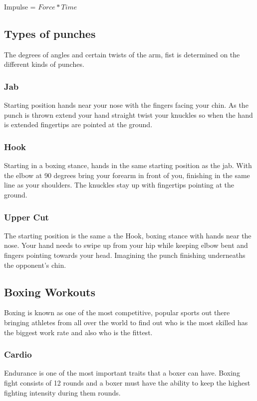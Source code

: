 \documentclass[a4paper,12pt]{report}
\begin{document}
Impulse = $Force * Time$

\subsection{Types of punches}
The degrees of angles and certain twists of the arm, fist is determined on the different kinds of punches.
\subsubsection{Jab}
Starting position hands near your nose with the fingers facing your chin.
As the punch is thrown extend your hand straight twist your knuckles so when the hand is extended fingertips are pointed at the ground.

\subsubsection{Hook}
Starting in a boxing stance, hands in the same starting position as the jab.
With the elbow at 90 degrees bring your forearm in front of you, finishing in the same line as your shoulders. The knuckles stay up with fingertips pointing at the ground.

\subsubsection{Upper Cut}
The starting position is the same a the Hook, boxing stance with hands near the nose. 
Your hand needs to swipe up from your hip while keeping elbow bent and fingers pointing towards your head. Imagining the punch finishing underneaths the opponent's chin.\cite{punchingPhysics}

\subsection{Boxing Workouts}
Boxing is known as one of the most competitive, popular sports out there bringing athletes from all over the world to find out who is the most skilled has the biggest work rate and also who is the fittest.

\subsubsection{Cardio}
Endurance is one of the most important traits that a boxer can have. Boxing fight consists of 12 rounds and a boxer must have the ability to keep the highest fighting intensity during them rounds.
\end{document}

